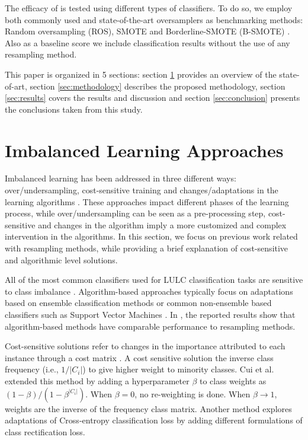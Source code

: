 \documentclass[remotesensing,article,submit,moreauthors,pdftex]{Definitions/mdpi}
\begin{document}
\begin{paracol}{2}
\linenumbers
\switchcolumn

The efficacy of  is tested using different
types of classifiers. To do so, we employ both commonly used and
state-of-the-art oversamplers as benchmarking methods: Random oversampling
(ROS),  SMOTE and Borderline-SMOTE (B-SMOTE) \cite{Han2005}. Also
as a baseline score we include classification results without the use of any
resampling method.

This paper is organized in 5 sections: section \ref{sec:sota} provides an
overview of the state-of-art, section \ref{sec:methodology} describes the
proposed methodology, section \ref{sec:results} covers the results and
discussion and section \ref{sec:conclusion} presents the conclusions taken from
this study.

\section{Imbalanced Learning Approaches} \label{sec:sota}

Imbalanced learning has been addressed in three different ways:
over/undersampling, cost-sensitive training and changes/adaptations in the
learning algorithms \cite{Kaur2019}. These approaches impact different
phases of the learning process, while over/undersampling can be seen as a
pre-processing step, cost-sensitive and changes in the algorithm imply a more
customized and complex intervention in the algorithms. In this
section, we focus on previous work related with resampling methods, while
providing a brief explanation of cost-sensitive and algorithmic level solutions.

All of the most common classifiers used for LULC classification tasks
\cite{Khatami2016, Gavade2019} are sensitive to class imbalance
\cite{Blagus2010}. Algorithm-based approaches typically focus on adaptations
based on ensemble classification methods \cite{Mellor2015} or common
non-ensemble based classifiers such as Support Vector Machines \cite{Shao2014}.
In \cite{Lee2016}, the reported results show that algorithm-based methods have
comparable performance to resampling methods.

Cost-sensitive solutions refer to changes in the importance attributed to each
instance through a cost matrix \cite{Huang2016,Cui2019,Dong2017}. A
 cost sensitive solution
 the inverse class frequency (i.e., $1/|C_i|$) to give higher weight to
minority classes. Cui et al. \cite{Cui2019} extended this method by adding a
hyperparameter $\beta$ to class weights as $(1-\beta)/(1-\beta^{|C_i|})$. When
$\beta=0$, no re-weighting is done. When $\beta\rightarrow 1$, weights are the
inverse of the frequency class matrix. Another method \cite{Dong2017} explores
adaptations of Cross-entropy classification loss by adding different
formulations of class rectification loss.


\end{paracol}
\end{document}
